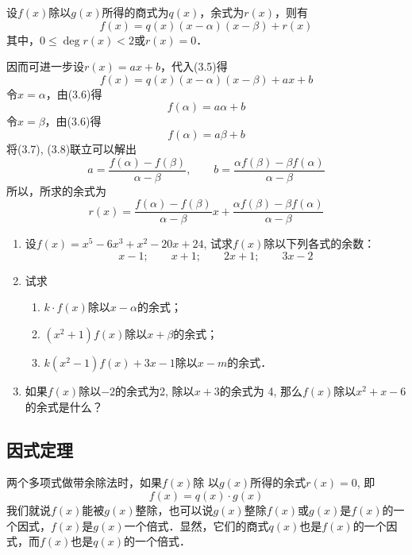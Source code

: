 \begin{solution}
设$f(x)$除以$g(x)$所得的商式为$q(x)$，余式为$r(x)$，则有
\begin{equation}
f(x)=q(x)(x-\alpha)(x-\beta)+r(x)
\end{equation}
    其中，$0\le \deg r(x)<2$或$r(x)=0$．

因而可进一步设$r(x)=ax+b$，代入(3.5)得
\begin{equation}
    f(x)=q(x)(x-\alpha)(x-\beta)+ax+b
\end{equation}
令$x=\alpha$，由(3.6)得
\begin{equation}
    f(\alpha)=a\alpha+b
\end{equation}
令$x=\beta$，由(3.6)得
\begin{equation}
    f(\alpha)=a\beta+b
\end{equation}
将(3.7), (3.8)联立可以解出
\[a=\frac{f(\alpha)-f(\beta)}{\alpha-\beta},\qquad b=\frac{\alpha f(\beta)-\beta f(\alpha)}{\alpha-\beta}\]
所以，所求的余式为
\[r(x)=\frac{f(\alpha)-f(\beta)}{\alpha-\beta}x+\frac{\alpha f(\beta)-\beta f(\alpha)}{\alpha-\beta}\]
\end{solution}

\begin{ex}
\begin{enumerate}
\item 设$f(x)=x^5-6x^3+x^2-20x+24$, 试求$f(x)$除以下列各式的余数：
\[x-1;\qquad  x+1;\qquad  2x+1;\qquad  3x-2\]
\item 试求
\begin{enumerate}
\item $k\cdot f(x)$除以$x-\alpha$的余式；
\item $(x^2+1)f(x)$除以$x+\beta$的余式；
\item $k(x^2-1)f(x)+3x-1$除以$x-m$的余式．
\end{enumerate}

\item 如果$f(x)$除以$-2$的余式为2, 除以$x+3$的余式为
4, 那么$f(x)$除以$x^2+x-6$的余式是什么？
\end{enumerate}
\end{ex}



\subsection{因式定理}

两个多项式做带余除法时，如果$f(x)$除
以$g(x)$所得的余式$r(x)=0$, 即
\[f (x) =q (x) \cdot g (x) \]
我们就说$f(x)$能被$g(x)$整除，也可以说$g(x)$整除$f(x)$或$g(x)$是$f(x)$的一个因式，$f(x)$是$g(x)$一个倍式．显然，它们的商式$q(x)$也是$f(x)$的一个因式，而$f(x)$也是$q(x)$的一个倍式．

